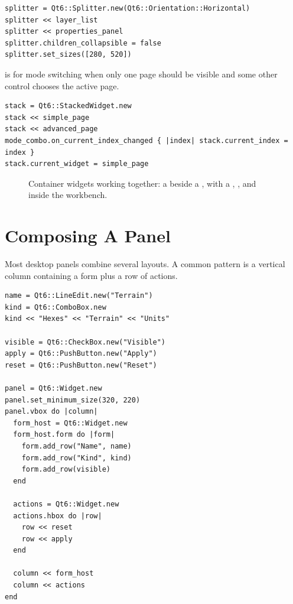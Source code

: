 \begin{lstlisting}[style=crystal]
splitter = Qt6::Splitter.new(Qt6::Orientation::Horizontal)
splitter << layer_list
splitter << properties_panel
splitter.children_collapsible = false
splitter.set_sizes([280, 520])
\end{lstlisting}

 is for mode switching when only one page should be visible and some other control chooses the active page.

\begin{lstlisting}[style=crystal]
stack = Qt6::StackedWidget.new
stack << simple_page
stack << advanced_page
mode_combo.on_current_index_changed { |index| stack.current_index = index }
stack.current_widget = simple_page
\end{lstlisting}

\begin{figure}[htbp]
  \centering
  \caption{Container widgets working together: a  beside a , with a , , and  inside the workbench.}
\end{figure}

\section{Composing A Panel}

Most desktop panels combine several layouts. A common pattern is a vertical column containing a form plus a row of actions.

\begin{lstlisting}[style=crystal]
name = Qt6::LineEdit.new("Terrain")
kind = Qt6::ComboBox.new
kind << "Hexes" << "Terrain" << "Units"

visible = Qt6::CheckBox.new("Visible")
apply = Qt6::PushButton.new("Apply")
reset = Qt6::PushButton.new("Reset")

panel = Qt6::Widget.new
panel.set_minimum_size(320, 220)
panel.vbox do |column|
  form_host = Qt6::Widget.new
  form_host.form do |form|
    form.add_row("Name", name)
    form.add_row("Kind", kind)
    form.add_row(visible)
  end

  actions = Qt6::Widget.new
  actions.hbox do |row|
    row << reset
    row << apply
  end

  column << form_host
  column << actions
end
\end{lstlisting}

